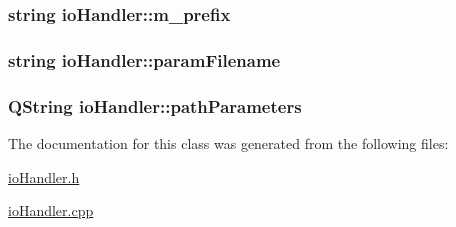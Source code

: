 \hypertarget{classio_handler_a80e45be220c886422df536b4714e4b94}{
\subsubsection[{m\+\_\+prefix}]{\setlength{\rightskip}{0pt plus 5cm}string io\+Handler\+::m\+\_\+prefix}}\label{classio_handler_a80e45be220c886422df536b4714e4b94}
\hypertarget{classio_handler_aa997341357b4da444f481ab43f455f9b}{
\subsubsection[{param\+Filename}]{\setlength{\rightskip}{0pt plus 5cm}string io\+Handler\+::param\+Filename}}\label{classio_handler_aa997341357b4da444f481ab43f455f9b}
\hypertarget{classio_handler_a18b3ace510b075e81a08a4a3ed9d00a2}{
\subsubsection[{path\+Parameters}]{\setlength{\rightskip}{0pt plus 5cm}Q\+String io\+Handler\+::path\+Parameters}}\label{classio_handler_a18b3ace510b075e81a08a4a3ed9d00a2}


The documentation for this class was generated from the following files\+:\begin{DoxyCompactItemize}
\item 
\hyperlink{io_handler_8h}{io\+Handler.\+h}\item 
\hyperlink{io_handler_8cpp}{io\+Handler.\+cpp}\end{DoxyCompactItemize}

